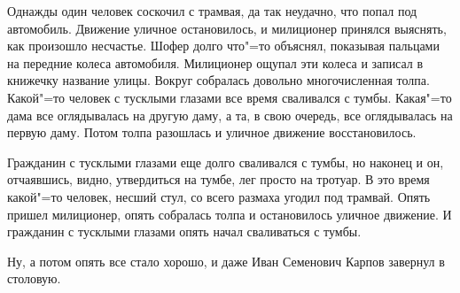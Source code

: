 Однажды один человек соскочил с трамвая,
да так  неудачно,  что попал под автомобиль.
Движение уличное остановилось, и  милиционер
принялся выяснять, как  произошло несчастье.
Шофер долго что"=то объяснял, показывая пальцами на передние колеса автомобиля. Милиционер ощупал эти колеса и записал в   книжечку
название улицы.  Вокруг  собралась  довольно
многочисленная  толпа.  Какой"=то  человек  с
тусклыми глазами все время сваливался с тумбы. Какая"=то дама все оглядывалась на другую
даму, а та, в свою очередь, все оглядывалась
на первую даму. Потом толпа разошлась и уличное движение восстановилось.

    Гражданин с тусклыми  глазами еще  долго
сваливался с тумбы, но наконец и он, отчаявшись, видно, утвердиться на тумбе, лег просто на тротуар. В это время какой"=то человек,
несший  стул, со всего  размаха  угодил  под
трамвай. Опять пришел милиционер, опять собралась толпа и остановилось  уличное  движение.  И гражданин с  тусклыми глазами  опять
начал сваливаться с тумбы.

    Ну, а  потом  опять  все стало хорошо, и
даже Иван Семенович Карпов завернул в столовую.

